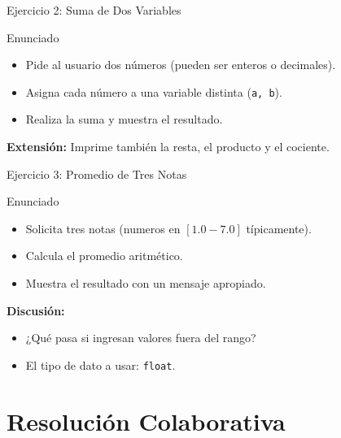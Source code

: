 \documentclass[10pt]{beamer}
\begin{document}
\begin{frame}{Ejercicio 2: Suma de Dos Variables}
  \begin{block}{Enunciado}
    \begin{itemize}
      \item Pide al usuario dos números (pueden ser enteros o decimales).
      \item Asigna cada número a una variable distinta (\texttt{a, b}).
      \item Realiza la suma y muestra el resultado.
    \end{itemize}
  \end{block}
  \textbf{Extensión:} Imprime también la resta, el producto y el cociente.
\end{frame}

\begin{frame}{Ejercicio 3: Promedio de Tres Notas}
  \begin{block}{Enunciado}
    \begin{itemize}
      \item Solicita tres notas (numeros en \([1.0 - 7.0]\) típicamente).
      \item Calcula el promedio aritmético.
      \item Muestra el resultado con un mensaje apropiado.
    \end{itemize}
  \end{block}
  \textbf{Discusión:}
  \begin{itemize}
    \item ¿Qué pasa si ingresan valores fuera del rango?
    \item El tipo de dato a usar: \texttt{float}.
  \end{itemize}
\end{frame}

\section{Resolución Colaborativa}
\end{document}
